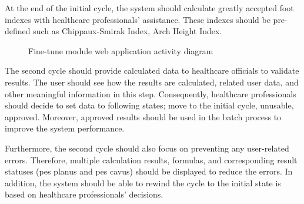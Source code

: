 At the end of the initial cycle, the system should calculate greatly accepted foot indexes with healthcare professionals' assistance. These indexes should be pre-defined such as Chippaux-Smirak Index, Arch Height Index.

\begin{figure}[htbp]
\centering
{}
\caption{Fine-tune module web application activity diagram}
\label{fig:FineTuneModuleWebApplicationSequenceDiagram}
\end{figure}

The second cycle should provide calculated data to healthcare officials to validate results. The user should see how the results are calculated, related user data, and other meaningful information in this step. Consequently, healthcare professionals should decide to set data to following states; move to the initial cycle, unusable, approved. Moreover, approved results should be used in the batch process to improve the system performance. 

Furthermore, the second cycle should also focus on preventing any user-related errors. Therefore, multiple calculation results, formulas, and corresponding result statuses (pes planus and pes cavus) should be displayed to reduce the errors. In addition, the system should be able to rewind the cycle to the initial state is based on healthcare professionals' decisions.


